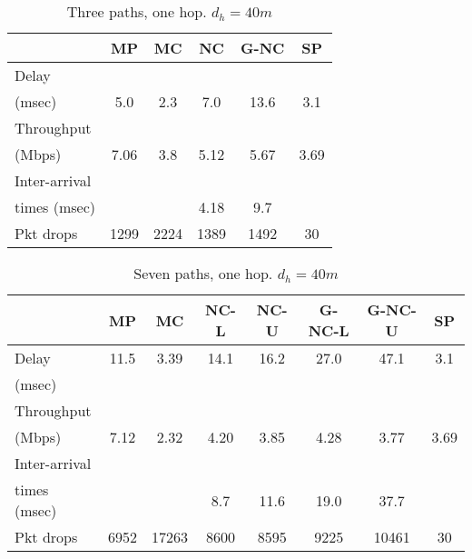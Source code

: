 \documentclass[journal, onecolumn, 12pt]{IEEEtran}
\begin{document}
\begin{table}[t]
\begin{center}
\scriptsize
\begin{tabular}{|l|c|c|c|c|c|}
\hline
~                                    & MP & MC & NC & G-NC & SP \\ \hline
Delay           &   &   &  &  & \\
(msec)   & 5.0   & 2.3  & 7.0  & 13.6 & 3.1  \\ \hline
Throughput                   & ~  & ~  & ~  & ~         & ~  \\
(Mbps)                   & 7.06  & 3.8  & 5.12 & 5.67 & 3.69\\ \hline
Inter-arrival              & ~  & ~  & ~  & ~         & ~  \\
times (msec)   &   &   &  4.18 & 9.7 & \\ \hline
Pkt drops  & 1299  & 2224  & 1389  & 1492 & 30 \\ \hline
\end{tabular}
\end{center}
\caption {Three paths, one hop. $d_{h}=40m$}
\label{tab:sim_topol_4}
\end{table}

\begin{table}
\begin{center}
\scriptsize
\begin{tabular}{|l|c|c|c|c|c|c|c|}
\hline
~                                   & MP & MC & NC-L & NC-U & G-NC-L & G-NC-U & SP \\ \hline
Delay           &  11.5 &  3.39 & 14.1 & 16.2 & 27.0 & 47.1 & 3.1\\
(msec)           &   &  &   &   &   &  &  \\ \hline
Throughput             & ~  & ~  & ~    & ~    & ~           & ~           & ~  \\
(Mbps)                 & 7.12 & 2.32  & 4.20 & 3.85 & 4.28 & 3.77 & 3.69\\ \hline
Inter-arrival             & ~  & ~  & ~    & ~    & ~           & ~           & ~  \\
times (msec)   &   &   & 8.7 & 11.6 & 19.0 & 37.7 &  \\ \hline
Pkt drops       & 6952 & 17263 &  8600 & 8595  & 9225 & 10461 & 30 \\ \hline
\end{tabular}
\end{center}
\caption {Seven paths, one hop. $d_{h}=40m$}
\label{tab:sim_topol_5}
\end{table}
\end{document}
